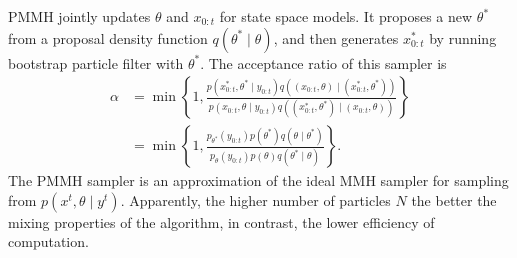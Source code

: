 PMMH jointly updates $\theta$ and $x_{0:t}$ for state space models. It proposes a new $\theta^*$ from a proposal density function $q(\theta^* \mid \theta)$, and then generates $x^*_{0:t}$ by running bootstrap particle filter with $\theta^*$. The acceptance ratio of this sampler is
\begin{align*}
\alpha &= \min \left\lbrace 1,\frac{ p(x_{0:t}^*, \theta^* \mid y_{0:t} ) q((x_{0:t},\theta) \mid  (x_{0:t}^*,\theta^*)   ) }{  p(x_{0:t}, \theta \mid y_{0:t} ) q((x_{0:t}^*,\theta^*) \mid  (x_{0:t},\theta) ) }  \right\rbrace \\
           &= \min \left\lbrace 1,\frac{p_{\theta^*} (y_{0:t}) p(\theta^*)q(\theta\mid\theta^*) }{  p_{\theta} (y_{0:t}) p(\theta)q(\theta^*\mid\theta)  }  \right\rbrace .
\end{align*}
The PMMH sampler is an approximation of the ideal MMH sampler for sampling from $p(x^t,\theta\mid y^t)$. Apparently, the higher number of particles $N$ the better the mixing properties of the algorithm, in contrast, the lower efficiency of computation.

%
%

